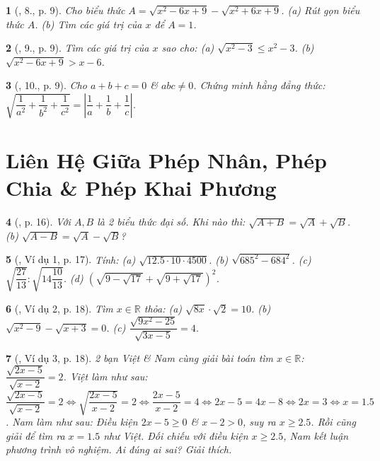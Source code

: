 \documentclass{article}
\newtheorem{baitoan}{}%
\begin{document}
\begin{baitoan}[\cite{Binh_Toan_9_tap_1}, 8., p. 9]
	Cho biểu thức $A = \sqrt{x^2 - 6x + 9} - \sqrt{x^2 + 6x + 9}$. (a) Rút gọn biểu thức $A$. (b) Tìm các giá trị của $x$ để $A = 1$.
\end{baitoan}

\begin{baitoan}[\cite{Binh_Toan_9_tap_1}, 9., p. 9]
	Tìm các giá trị của $x$ sao cho: (a) $\sqrt{x^2 - 3}\le x^2 - 3$. (b) $\sqrt{x^2 - 6x + 9} > x - 6$.
\end{baitoan}

\begin{baitoan}[\cite{Binh_Toan_9_tap_1}, 10., p. 9]
	Cho $a + b + c = 0$ \& $abc\ne0$. Chứng minh hằng đẳng thức: $\sqrt{\dfrac{1}{a^2} + \dfrac{1}{b^2} + \dfrac{1}{c^2}} = \left|\dfrac{1}{a} + \dfrac{1}{b} + \dfrac{1}{c}\right|$.
\end{baitoan}


\section{Liên Hệ Giữa Phép Nhân, Phép Chia \& Phép Khai Phương}

\begin{baitoan}[\cite{Binh_boi_duong_Toan_9_tap_1}, p. 16]
	Với $A,B$ là 2 biểu thức đại số. Khi nào thì: $\sqrt{A + B} = \sqrt{A} + \sqrt{B}$. (b) $\sqrt{A - B} = \sqrt{A} - \sqrt{B}$?
\end{baitoan}

\begin{baitoan}[\cite{Binh_boi_duong_Toan_9_tap_1}, Ví dụ 1, p. 17]
	Tính: (a) $\sqrt{12.5\cdot10\cdot4500}$. (b) $\sqrt{685^2 - 684^2}$. (c) $\sqrt{\dfrac{27}{13}}:\sqrt{14\dfrac{10}{13}}$. (d) $\left(\sqrt{9 - \sqrt{17}} + \sqrt{9 + \sqrt{17}}\right)^2$.
\end{baitoan}

\begin{baitoan}[\cite{Binh_boi_duong_Toan_9_tap_1}, Ví dụ 2, p. 18]
	Tìm $x\in\mathbb{R}$ thỏa: (a) $\sqrt{8x}\cdot\sqrt{2} = 10$. (b) $\sqrt{x^2 - 9} - \sqrt{x + 3} = 0$. (c) $\dfrac{\sqrt{9x^2 - 25}}{\sqrt{3x - 5}} = 4$.
\end{baitoan}

\begin{baitoan}[\cite{Binh_boi_duong_Toan_9_tap_1}, Ví dụ 3, p. 18]
	2 bạn Việt \& Nam cùng giải bài toán tìm $x\in\mathbb{R}$: $\dfrac{\sqrt{2x - 5}}{\sqrt{x - 2}} = 2$. Việt làm như sau: $\dfrac{\sqrt{2x - 5}}{\sqrt{x - 2}} = 2\Leftrightarrow\sqrt{\dfrac{2x - 5}{x - 2}} = 2\Leftrightarrow\dfrac{2x - 5}{x - 2} = 4\Leftrightarrow2x - 5 = 4x - 8\Leftrightarrow2x = 3\Leftrightarrow x = 1.5$. Nam làm như sau: Điều kiện $2x - 5\ge0$ \& $x - 2> 0$, suy ra $x\ge2.5$. Rồi cũng giải để tìm ra $x = 1.5$ như Việt. Đối chiếu với điều kiện $x\ge2.5$, Nam kết luận phương trình vô nghiệm. Ai đúng ai sai? Giải thích.
\end{baitoan}
\end{document}
